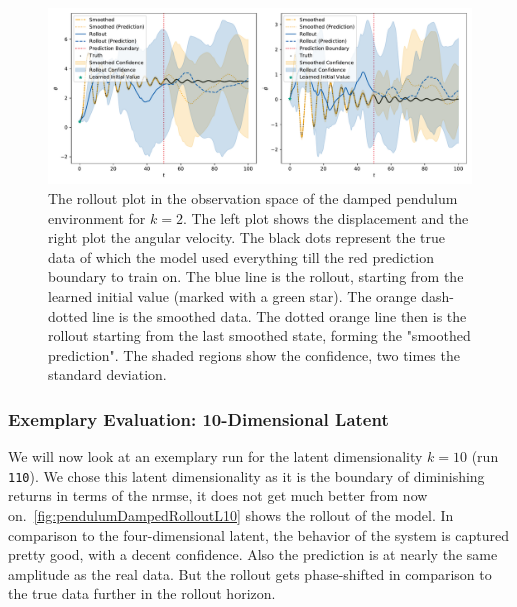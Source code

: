 			\begin{figure}
				\centering
				\includegraphics[width=\linewidth]{figures/results/pendulum-damped/run-latent-dim-02/rollout-observations-N0.pdf}
				\caption{The rollout plot in the observation space of the damped pendulum environment for \(k = 2\). The left plot shows the displacement and the right plot the angular velocity. The black dots represent the true data of which the model used everything till the red prediction boundary to train on. The blue line is the rollout, starting from the learned initial value (marked with a green star). The orange dash-dotted line is the smoothed data. The dotted orange line then is the rollout starting from the last smoothed state, forming the "smoothed prediction". The shaded regions show the confidence, \ie two times the standard deviation.}
				\label{fig:pendulumDampedRolloutL02}
			\end{figure}

		\subsubsection{Exemplary Evaluation: 10-Dimensional Latent}
			\label{subsubsec:pendulumDampedL10}

			We will now look at an exemplary run for the latent dimensionality \( k = 10 \) (run \texttt{110}). We chose this latent dimensionality as it is the boundary of diminishing returns in terms of the \ac{nrmse}, \ie it does not get much better from now on.~\autoref{fig:pendulumDampedRolloutL10} shows the rollout of the model. In comparison to the four-dimensional latent, the behavior of the system is captured pretty good, with a decent confidence. Also the prediction is at nearly the same amplitude as the real data. But the rollout gets phase-shifted in comparison to the true data further in the rollout horizon.

